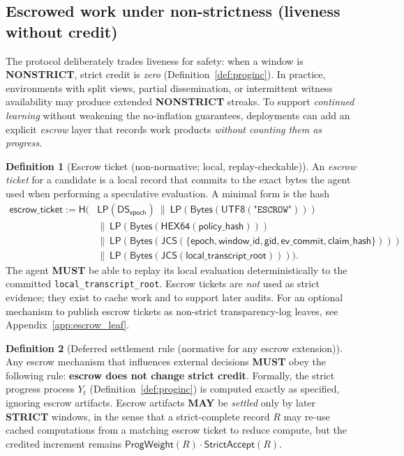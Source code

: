 \documentclass[11pt]{article}
\newcommand{\MUST}{\textbf{MUST}}
\newcommand{\MAY}{\textbf{MAY}}
\newcommand{\code}[1]{\texttt{#1}}
\newcommand{\term}[1]{\emph{#1}}
\newcommand{\1}{\mathbf{1}}
\newcommand{\Hash}{\mathsf{H}}
\newcommand{\DS}{\mathsf{DS}}
\newcommand{\LP}{\mathsf{LP}}
\theoremstyle{definition}
\newtheorem{definition}{Definition}
\theoremstyle{plain}
\begin{document}
\subsection{Escrowed work under non-strictness (liveness without credit)}
\label{sec:escrow}

The protocol deliberately trades liveness for safety: when a window is \textbf{NONSTRICT}, strict credit is \emph{zero} (Definition~\ref{def:proginc}).
In practice, environments with split views, partial dissemination, or intermittent witness availability may produce extended \textbf{NONSTRICT} streaks.
To support \emph{continued learning} without weakening the no-inflation guarantees, deployments can add an explicit \emph{escrow} layer that records work products \emph{without counting them as progress}.

\begin{definition}[Escrow ticket (non-normative; local, replay-checkable)]
\label{def:escrow_ticket}
An \term{escrow ticket} for a candidate is a local record that commits to the exact bytes the agent used when performing a speculative evaluation.
A minimal form is the hash
\begin{align*}
\textsf{escrow\_ticket}:=\Hash\big(
  &\LP(\DS_{\textsf{epoch}})\ \|\ \LP(\mathsf{Bytes}(\textsf{UTF8}(\texttt{"ESCROW"})))\\
  &\|\ \LP(\mathsf{Bytes}(\textsf{HEX64}(\textsf{policy\_hash})))\\
  &\|\ \LP(\mathsf{Bytes}(\textsf{JCS}(\{\textsf{epoch},\textsf{window\_id},\textsf{gid},\textsf{ev\_commit},\textsf{claim\_hash}\})))\\
  &\|\ \LP(\mathsf{Bytes}(\textsf{JCS}(\textsf{local\_transcript\_root})))
\big).
\end{align*}
The agent \MUST{} be able to replay its local evaluation deterministically to the committed \code{local\_transcript\_root}.
Escrow tickets are \emph{not} used as strict evidence; they exist to cache work and to support later audits. For an optional mechanism to publish escrow tickets as non-strict transparency-log leaves, see Appendix~\ref{app:escrow_leaf}.
\end{definition}

\begin{definition}[Deferred settlement rule (normative for any escrow extension)]
\label{def:escrow_settle}
Any escrow mechanism that influences external decisions \MUST{} obey the following rule:
\textbf{escrow does not change strict credit}.
Formally, the strict progress process $Y_t$ (Definition~\ref{def:proginc}) is computed exactly as specified, ignoring escrow artifacts.
Escrow artifacts \MAY{} be \emph{settled} only by later \textbf{STRICT} windows, in the sense that a strict-complete record $R$ may re-use cached computations from a matching escrow ticket to reduce compute, but the credited increment remains $\mathsf{ProgWeight}(R)\cdot\mathsf{StrictAccept}(R)$.
\end{definition}
\end{document}
